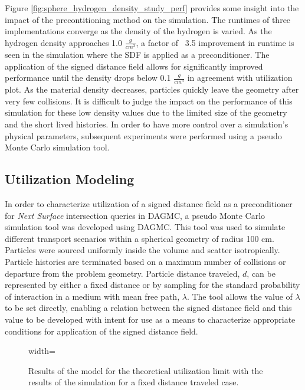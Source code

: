 Figure \ref{fig:sphere_hydrogen_density_study_perf} provides some insight into the
impact of the precontitioning method on the simulation. The runtimes
of three implementations  converge as the density of the
hydrogen is varied. As the hydrogen density approaches 1.0 $\frac{g}{cm^3}$, a
factor of ~3.5 improvement in runtime is seen in the simulation where the SDF is
applied as a preconditioner. The application of the signed distance field allows
for significantly improved performance until the density drops below 0.1
$\frac{g}{cm^3}$ in agreement with utilization plot. As the material density
decreases, particles quickly leave the geometry after very few collisions. It is
difficult to judge the impact on the performance of this simulation for these
low density values due to the limited size of the geometry and the short lived
histories.  In order to have more control over a simulation's physical
parameters, subsequent experiments were performed using a pseudo Monte Carlo
simulation tool.

\subsection{Utilization Modeling}

In order to characterize utilization of a signed distance field as a
preconditioner for \textit{Next Surface} intersection queries in DAGMC, a pseudo Monte
Carlo simulation tool was developed using DAGMC. This tool was used to simulate
different transport scenarios within a spherical geometry of radius 100
cm. Particles were sourced uniformly inside the volume and scatter
isotropically. Particle histories are terminated based on a maximum number of
collisions or departure from the problem geometry. Particle distance traveled,
$d$, can be represented by either a fixed distance or by sampling for the
standard probability of interaction in a medium with mean free path,
$\lambda$. The tool allows the value of $\lambda$ to be set directly, enabling a
relation between the signed distance field and this value to be developed with
intent for use as a means to characterize appropriate
conditions for application of the signed distance field.

\begin{figure}[H]
  \centering
  {width=\textwidth}
  \caption{Results of the model for the theoretical utilization limit with the
    results of the simulation for a fixed distance traveled case.}
  \label{fig:sdf_fixed_dist}    
\end{figure}

